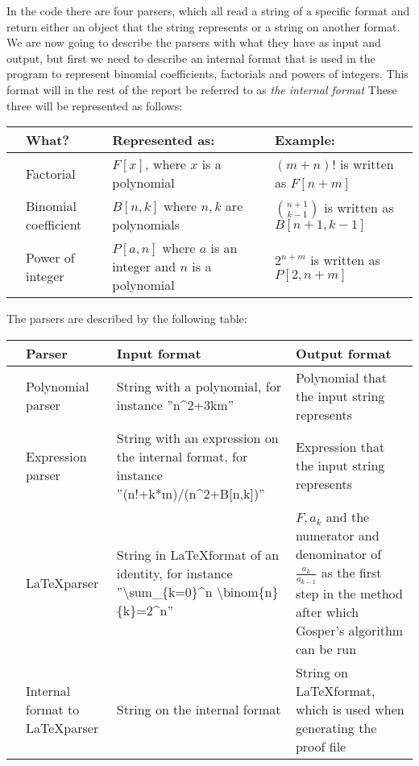 In the code there are four parsers, which all read a string of a specific format and return either an object that the string represents or a string on another format. We are now going to describe the parsers with what they have as input and output, but first we need to describe an internal format that is used in the program to represent binomial coefficients, factorials and powers of integers. This format will in the rest of the report be referred to as \textit{the internal format} These three will be represented as follows:
\begin{center}
  \begin{tabular}{C{1mm}C{3cm}|C{4cm}|C{4cm}}
    &\textbf{What?}   & \textbf{Represented as:} & \textbf{Example:} \\ \hline
    &Factorial & $F[x]$, where $x$ is a polynomial & $(m+n)!$ is written as $F[n+m]$ \\ \hline
    &Binomial coefficient & $B[n,k]$ where $n,k$ are polynomials & $\binom{n+1}{k-1}$ is written as $B[n+1,k-1]$ \\ \hline
    &Power of integer & $P[a,n]$ where $a$ is an integer and $n$ is a polynomial & $2^{n+m}$ is written as $P[2,n+m]$ \\
  \end{tabular}
\end{center}

The parsers are described by the following table:
\begin{center}
  \begin{tabular}{C{1mm}C{3cm}|C{4cm}|C{4cm}}
    &\textbf{Parser}   & \textbf{Input format} & \textbf{Output format} \\ \hline
    &Polynomial parser & String with a polynomial, for instance ''n\^{}2+3km'' & Polynomial that the input string represents \\ \hline
    &Expression parser & String with an expression on the internal format, for instance ''(n!+k*m)/(n\^{}2+B[n,k])'' & Expression that the input string represents \\ \hline
    &\LaTeX parser     & String in \LaTeX format of an identity, for instance ''\textbackslash sum\_\{k=0\}\^{}n \textbackslash binom\{n\}\{k\}=2\^{}n'' & $F, a_k$ and the numerator and denominator of $\frac{a_k}{a_{k-1}}$ as the first step in the method after which Gosper's algorithm can be run \\ \hline
    &Internal format to \LaTeX parser  & String on the internal format & String on \LaTeX format, which is used when generating the proof file \\
  \end{tabular}
\end{center}

